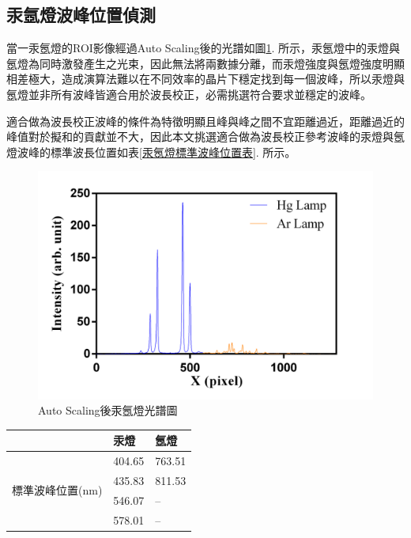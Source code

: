\subsection{汞氬燈波峰位置偵測}
當一汞氬燈的ROI影像經過Auto Scaling後的光譜如圖\ref{Auto Scaling後汞氬燈光譜圖}. 所示，汞氬燈中的汞燈與氬燈為同時激發產生之光束，因此無法將兩數據分離，而汞燈強度與氬燈強度明顯相差極大，造成演算法難以在不同效率的晶片下穩定找到每一個波峰，所以汞燈與氬燈並非所有波峰皆適合用於波長校正，必需挑選符合要求並穩定的波峰。
\par 
適合做為波長校正波峰的條件為特徵明顯且峰與峰之間不宜距離過近，距離過近的峰值對於擬和的貢獻並不大，因此本文挑選適合做為波長校正參考波峰的汞燈與氬燈波峰的標準波長位置如表\ref{汞氬燈標準波峰位置表}. 所示。
\begin{figure}[H] %
	\centering %
	\vspace{0.8cm}
	\setlength{\abovecaptionskip}{0.cm}
	\includegraphics[width=\textwidth]{figures/HG_AR_LAMP.PNG} %
	\caption{Auto Scaling後汞氬燈光譜圖} %
	\label{Auto Scaling後汞氬燈光譜圖} %
\end{figure}
\newpage
\begin{center}
\vspace{0.8cm}
\label{汞氬燈標準波峰位置表}
\begin{tabularx}{\textwidth}{m{}<{\centering} m{}<{\centering} m{}<{\centering}}
	\hline\hline
          & 汞燈 & 氬燈 \\
	\hline
	\multirow{4}{*}{標準波峰位置(nm) }
	      & 404.65 & 763.51 \\
	      & 435.83 & 811.53 \\
	      & 546.07 & -- \\
	      & 578.01 & -- \\
	\hline\hline
\end{tabularx}
\vspace{10pt}
\end{center}
